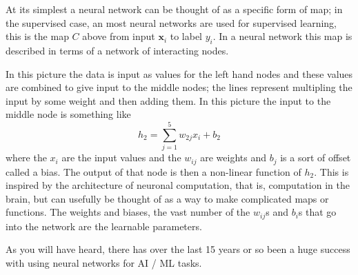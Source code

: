 \documentclass[12pt]{article}
\begin{document}
At its simplest a neural network can be thought of as a specific form
of map; in the supervised case, an most neural networks are used for
supervised learning, this is the map $C$ above from input
$\mathbf{x}_i$ to label $y_i$. In a neural network this map is
described in terms of a network of interacting nodes.
\begin{center}
\end{center}
In this picture the data is input as values for the left hand nodes
and these values are combined to give input to the middle nodes; the
lines represent multipling the input by some weight and then adding
them. In this picture the input to the middle node is something like
\begin{equation}
  h_2=\sum_{j=1}^5w_{2j}x_i+b_2
\end{equation}
where the $x_i$ are the input values and the $w_{ij}$ are weights and
$b_j$ is a sort of offset called a bias. The output of that node is
then a non-linear function of $h_2$. This is inspired by the
architecture of neuronal computation, that is, computation in the
brain, but can usefully be thought of as a way to make complicated
maps or functions. The weights and biases, the vast number of the
$w_{ij}$s and $b_i$s that go into the network are the learnable
parameters.

As you will have heard, there has over the last 15 years or so been a
huge success with using neural networks for AI / ML tasks.
\end{document}
